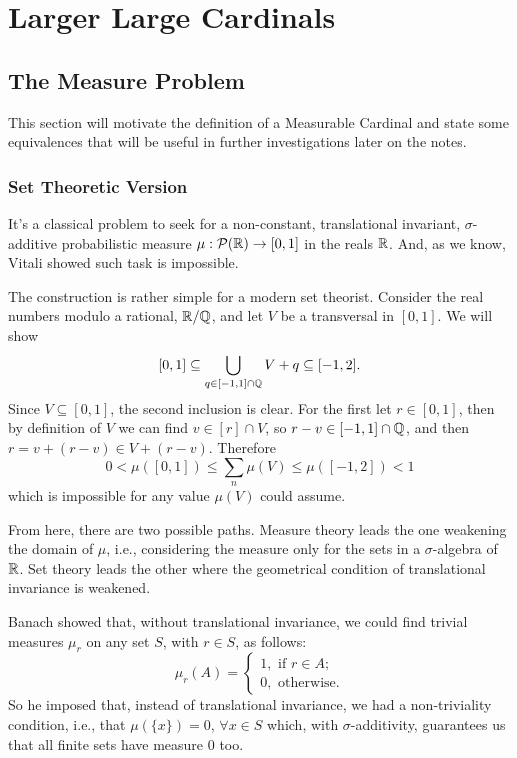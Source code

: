 \chapter{Larger Large Cardinals}

\section{The Measure Problem}

This section will motivate the definition of a Measurable Cardinal and state some equivalences that will be useful in further investigations later on the notes.

\subsection{Set Theoretic Version}

It's a classical problem to seek for a non-constant, translational invariant, $\sigma$-additive probabilistic measure $\mu:\mathcal{P}(\mathbb{R})\to[0,1]$ in the reals $\mathbb{R}$. And, as we know, Vitali showed such task is impossible.

The construction is rather simple for a modern set theorist. Consider the real numbers modulo a rational, $\mathbb{R}/\mathbb{Q}$, and let $V$ be a transversal in $[0,1]$. We will show
$$[0,1]\subseteq\bigcup_{q\in[-1,1]\cap\mathbb{Q}}V+q\subseteq[-1,2].$$
Since $V\subseteq[0,1]$, the second inclusion is clear. For the first let $r\in[0,1]$, then by definition of $V$ we can find $v\in[r]\cap V$, so $r-v\in[-1,1]\cap\mathbb{Q}$, and then $r=v+(r-v)\in V+(r-v)$. Therefore
$$0<\mu([0,1])\leq\sum_{n}\mu(V)\leq\mu([-1,2])<1$$
which is impossible for any value $\mu(V)$ could assume.

From here, there are two possible paths. Measure theory leads the one weakening the domain of $\mu$, i.e., considering the measure only for the sets in a $\sigma$-algebra of $\mathbb{R}$. Set theory leads the other where the geometrical condition of translational invariance is weakened.

Banach showed that, without translational invariance, we could find trivial measures $\mu_r$ on any set $S$, with $r\in S$, as follows:
\begin{equation}\label{eq:banach_trivial_measure}
    \mu_r(A)=\begin{cases}
    1,\text{ if }r\in A;\\
    0,\text{ otherwise}.
\end{cases}
\end{equation}
So he imposed that, instead of translational invariance, we had a non-triviality condition, i.e., that $\mu(\{x\})=0$, $\forall x\in S$ which, with $\sigma$-additivity, guarantees us that all finite sets have measure $0$ too.

